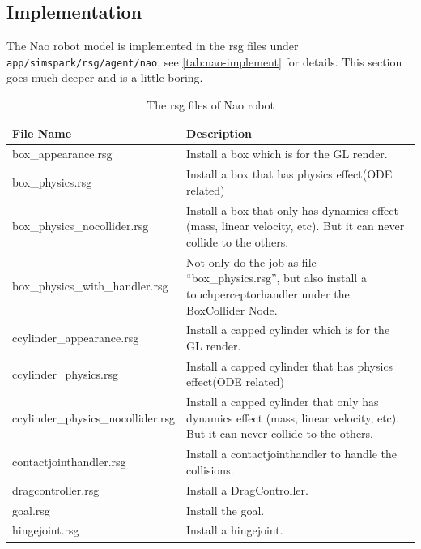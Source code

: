 \subsection{Implementation}
The Nao robot model is implemented in the rsg files under
\texttt{app/simspark/rsg/agent/nao}, see \autoref{tab:nao-implement}
for details. This section goes much deeper and is a little boring.
\begin{table}[htp]
  \centering
  \caption{The rsg files of Nao robot}
  \label{tab:nao-implement}
  \begin{tabular}{lp{}}
    \hline
    {\bf File Name}             & {\bf Description} \\
    \hline
    box\_appearance.rsg         & Install a box which is for the GL
    render. \\
    box\_physics.rsg            & Install a box that has physics
    effect(ODE related) \\
    box\_physics\_nocollider.rsg & Install a box that only has dynamics
    effect (mass, linear velocity, etc). But it can never collide to
    the others. \\
    box\_physics\_with\_handler.rsg & Not only do the job as file
    “box\_physics.rsg”, but also install a touchperceptorhandler under
    the BoxCollider Node. \\
    ccylinder\_appearance.rsg   & Install a capped cylinder which is
    for the GL render. \\
    ccylinder\_physics.rsg      & Install a capped cylinder that has
    physics effect(ODE related) \\
    ccylinder\_physics\_nocollider.rsg & Install a capped cylinder that
    only has dynamics effect (mass, linear velocity, etc). But it can
    never collide to the others. \\
    contactjointhandler.rsg    & Install a contactjointhandler to
    handle the collisions. \\
    dragcontroller.rsg         & Install a DragController. \\
    goal.rsg                   & Install the goal. \\
    hingejoint.rsg             & Install a hingejoint. \\
    \hline
  \end{tabular}
\end{table}

